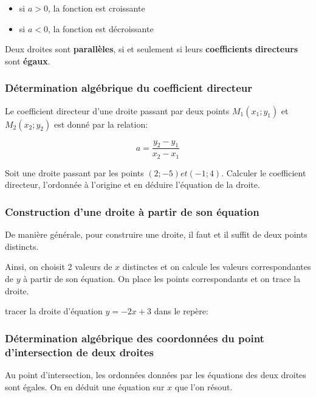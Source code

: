 \documentclass[a4paper,12pt]{scrartcl}
\begin{document}
\begin{itemize}
\item si $a>0$, la fonction est croissante
\item si $a<0$, la fonction est décroissante
\end{itemize}

Deux droites sont \textbf{parallèles}, si et seulement si leurs \textbf{coefficients directeurs} sont \textbf{égaux}.

\subsubsection{Détermination algébrique du coefficient directeur}

Le coefficient directeur d'une droite passant par deux points $M_1(x_1;y_1)$ et $M_2(x_2;y_2)$ est donné par la relation: 

\begin{equation}
a = \frac{y_2 - y_1}{x_2 - x_1}
\end{equation}

\exemple{}
Soit une droite passant par les points $(2 ;-5) et (-1 ; 4)$. Calculer le coefficient directeur, l'ordonnée à l'origine et en déduire l'équation de la droite.


\subsubsection{Construction d'une droite à partir de son équation}

De manière générale, pour construire une droite, il faut et il suffit de deux points distincts. 

Ainsi, on choisit 2 valeurs de $x$ distinctes et on calcule les valeurs correspondantes de $y$ à partir de son équation. On place les points correspondants et on trace  la droite. 

\exemple{}
tracer la droite d'équation $y = -2x + 3$ dans le repère:

\begin{center}
\end{center}

\subsubsection{Détermination algébrique des coordonnées du point d'intersection de deux droites}

Au point d'intersection, les ordonnées données par les équations des deux droites sont égales. On en déduit une équation sur $x$ que l'on résout. 
\end{document}
